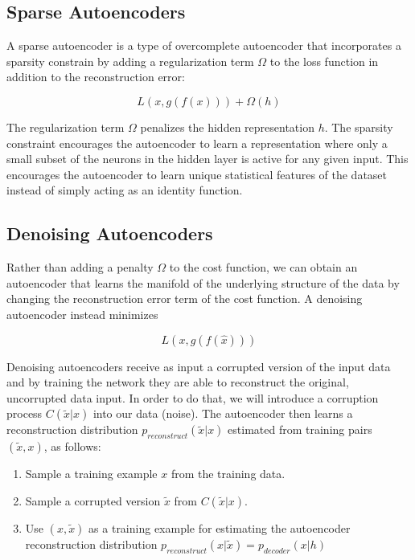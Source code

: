 
\subsection{Sparse Autoencoders}

A sparse autoencoder is a type of overcomplete autoencoder that incorporates a sparsity constrain by adding a regularization term $\Omega$ to the loss function in addition to the reconstruction error:

$$ L(x, g(f(x))) + \Omega(h) $$

The regularization term $\Omega$ penalizes the hidden representation $h$.  The sparsity constraint encourages the autoencoder to learn a representation where only a small subset of the neurons in the hidden layer is active for any given input. This encourages the autoencoder to learn unique statistical features of the dataset instead of simply acting as an identity function.

\subsection{Denoising Autoencoders}

Rather than adding a penalty $\Omega$ to the cost function, we can obtain an autoencoder that learns the manifold of the underlying structure of the data by changing the reconstruction error term of the cost function. A denoising autoencoder instead minimizes

$$ L(x, g (f ( \hat{x})))$$

\noindent Denoising autoencoders receive as input a corrupted version of the input data and by training the network they are able to reconstruct the original, uncorrupted data input. In order to do that, we will introduce a corruption process $C(\tilde{x} \vert x)$ into our data (noise). The autoencoder then learns a reconstruction distribution $ p_{reconstruct} (\tilde{x} \vert x)  $ estimated from training pairs $ (\tilde{x}, x) $, as follows:

\begin{enumerate}
    \item Sample a training example $x$ from the training data.
    \item Sample a corrupted version $ \tilde{x}$ from $C(\tilde{x} \vert x)$.
    \item Use $ \left( x, \tilde{x} \right) $ as a training example for estimating the autoencoder reconstruction distribution $p_{reconstruct} (x \vert \tilde{x} ) = p_{decoder} (x \vert h)$
\end{enumerate}


